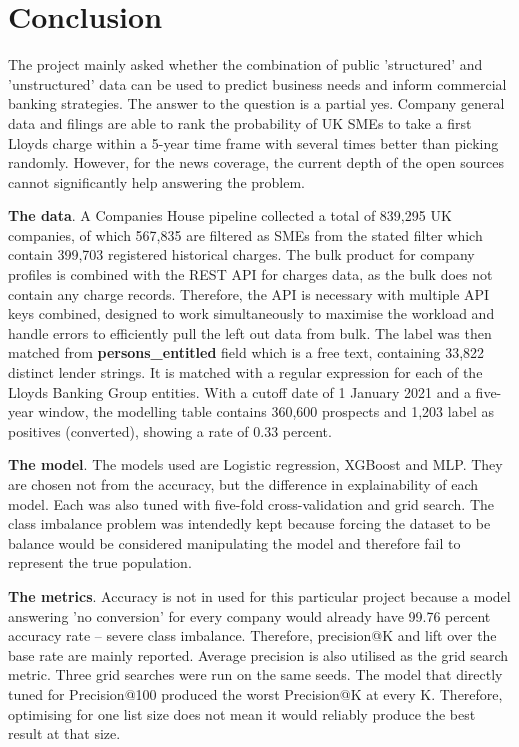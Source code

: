 \documentclass[ %
                    author={Natchalin Iwsakul \\[0.4em] Inkaphol Siriwongwattana \\[0.4em] Tanaphan Kummaraphat \\[0.6em] Patorn Srisupap},,
                supervisor={Fernando Moreno-Pino},
                    degree={MSc},
                     title={Propensity Modelling for SME Commercial Lending Using Open Public Data
},
                  subtitle={Companies House and GDELT as predictors of first-time borrowing},
                      type={},
                      year={2026}]{dissertation}
\begin{document}

\chapter{Conclusion}
\label{chap:conclusion}

\noindent

The project mainly asked whether the combination of public 'structured' and 'unstructured' data can be used to predict business needs and inform commercial banking strategies. The answer to the question is a partial yes. Company general data and filings are able to rank the probability of UK SMEs to take a first Lloyds charge within a 5-year time frame with several times better than picking randomly. However, for the news coverage, the current depth of the open sources cannot significantly help answering the problem.


\textbf{The data}. A Companies House pipeline collected a total of 839,295 UK companies, of which 567,835 are filtered as SMEs from the stated filter which contain 399,703 registered historical charges. The bulk product for company profiles is combined with the REST API for charges data, as the bulk does not contain any charge records. Therefore, the API is necessary with multiple API keys combined, designed to work simultaneously to maximise the workload and handle errors to efficiently pull the left out data from bulk. The label was then matched from 
\textbf{persons\_entitled} field which is a free text, containing 33,822 distinct lender strings. It is matched with a regular expression for each of the Lloyds Banking Group entities. With a cutoff date of 1 January 2021 and a five-year window, the modelling table contains 360,600 prospects and 1,203 label as positives (converted), showing a rate of 0.33 percent.

\textbf{The model}. The models used are Logistic regression, XGBoost and MLP. They are chosen not from the accuracy, but the difference in explainability of each model. Each was also tuned with five-fold cross-validation and grid search. The class imbalance problem was intendedly kept because forcing the dataset to be balance would be considered manipulating the model and therefore fail to represent the true population.

\textbf{The metrics}. Accuracy is not in used for this particular project because a model answering 'no conversion' for every company would already have 99.76 percent accuracy rate -- severe class imbalance. Therefore, precision@K and lift over the base rate are mainly reported. Average precision is also utilised as the grid search metric. Three grid searches were run on the same seeds. The model that directly tuned for Precision@100 produced the worst Precision@K at every K. Therefore, optimising for one list size does not mean it would reliably produce the best result at that size.
\end{document}

